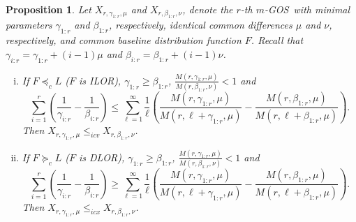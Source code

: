 \documentclass [11pt]{article}
\newtheorem{proposition}{Proposition}
\newcommand{\gos}{GOS}
\begin{document}
\begin{proposition}
\label{prop:log-odds}
Let $X_{r,\gamma_{1:r}, \mu}$ and  $X_{r,\beta_{1:r},\nu}$, denote the $r$-th $m$-\gos\ with minimal parameters  $\gamma_{1:r}$ and $\beta_{1:r}$, respectively, identical common differences $\mu$ and $\nu$, respectively, and common baseline distribution function $F$. Recall that $\gamma_{i:r}=\gamma_{1:r}+(i-1)\mu$ and $\beta_{i:r}=\beta_{1:r}+(i-1)\nu$.
    \begin{enumerate}[(i)]
    \item
    If $F \preceq_c L$ ($F$ is ILOR),
    $\gamma_{1:r}\geq\beta_{1:r}$, $\frac{M(r,\gamma_{1:r},\mu)}{M(r,\beta_{1:r},\nu)} < 1$ and
    \begin{equation}
    \label{eq:icx-ior}
    \sum_{i=1}^r \left(\frac{1}{\gamma_{i:r}}-\frac{1}{\beta_{i:r}}\right)
    \leq
    \sum_{\ell=1}^\infty\frac1\ell\left(
    \frac{M(r,\gamma_{1:r},\mu)}{M(r,\ell+\gamma_{1:r},\mu)}
    -
    \frac{M(r,\beta_{1:r},\mu)}{M(r,\ell+\beta_{1:r},\mu)}\right).
    \end{equation}
    Then $X_{r,\gamma_{1:r}, \mu} \leq_{icv} X_{r,\beta_{1:r},\nu}$.
    \item
    If $F \succeq_c L$ ($F$ is DLOR), 
    $\gamma_{1:r}\geq\beta_{1:r}$, 
    $\frac{M(r,\gamma_{1:r},\mu)}{M(r,\beta_{1:r},\nu)} < 1$ and
    \begin{equation}
    \label{eq:icv-dor}
    \sum_{i=1}^r \left(\frac{1}{\gamma_{i:r}}-\frac{1}{\beta_{i:r}}\right)
    \geq
    \sum_{\ell=1}^\infty\frac1\ell\left(
    \frac{M(r,\gamma_{1:r},\mu)}{M(r,\ell+\gamma_{1:r},\mu)}
    -
    \frac{M(r,\beta_{1:r},\mu)}{M(r,\ell+\beta_{1:r},\mu)}\right).
    \end{equation}
    Then $X_{r,\gamma_{1:r}, \mu} \leq_{icx} X_{r,\beta_{1:r},\nu}$.
    \end{enumerate}
\end{proposition}
\end{document}

